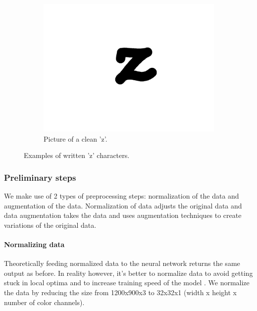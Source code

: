 \documentclass{article}
\begin{document}
\begin{figure}
\begin{subfigure}{0.15\textwidth}
  \includegraphics[width=\linewidth]{images/good_char}
  \caption{Picture of a clean 'z'.}
\end{subfigure}
\caption{Examples of written 'z' characters.}
\label{fig:char}
\end{figure}


\subsubsection{Preliminary steps}
\label{sec:preproc}
We make use of 2 types of preprocessing steps: normalization of the data and augmentation of the data. Normalization of data adjusts the original data and data augmentation takes the data and uses augmentation techniques to create variations of the original data.

\paragraph{Normalizing data} 
\label{par:norm}
Theoretically feeding normalized data to the neural network returns the same output as before. 
In reality however, it's better to normalize data to avoid getting stuck in local optima and to increase training speed of the model \cite{NormGoal}. We normalize the data by reducing the size from 1200x900x3 to 32x32x1 (width x height x number of color channels).


\end{document}
